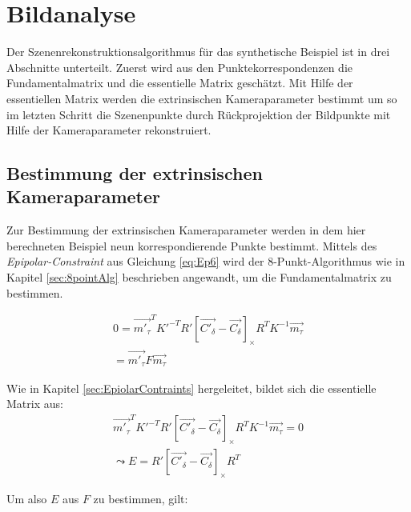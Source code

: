 


\section{Bildanalyse}
\label{sec:MinimalFun}

Der Szenenrekonstruktionsalgorithmus für das synthetische Beispiel ist in drei Abschnitte unterteilt. Zuerst wird aus den Punktekorrespondenzen die Fundamentalmatrix und die essentielle Matrix geschätzt. Mit Hilfe der essentiellen Matrix werden die extrinsischen Kameraparameter bestimmt um so im letzten Schritt die Szenenpunkte durch Rückprojektion der Bildpunkte mit Hilfe der Kameraparameter rekonstruiert. 

\subsection{Bestimmung der extrinsischen Kameraparameter}

Zur Bestimmung der extrinsischen Kameraparameter werden in dem hier berechneten Beispiel neun korrespondierende Punkte bestimmt. Mittels des \textit{Epipolar-Constraint} aus Gleichung \ref{eq:Ep6} wird der 8-Punkt-Algorithmus wie in Kapitel \ref{sec:8pointAlg} beschrieben angewandt, um die Fundamentalmatrix zu bestimmen.

\begin{gather}
	0=\vec{m'_\tau}^TK'^{-T}R' \left[ \vec{C'_\delta}-\vec{C_\delta}\right]_\times R^TK^{-1}\vec{m_\tau}\\
	=\vec{m'_\tau}F\vec{m_\tau}
\end{gather}


Wie in Kapitel \ref{sec:EpiolarContraints} hergeleitet, bildet sich die essentielle Matrix aus:
\begin{gather}
	\vec{m'_\tau}^TK'^{-T}R' \left[ \vec{C'_\delta}-\vec{C_\delta}\right]_\times R^TK^{-1}\vec{m_\tau}=0\\
	\leadsto E = R' \left[ \vec{C'_\delta}-\vec{C_\delta}\right]_\times R^T		
\end{gather}

Um also $E$ aus $F$ zu bestimmen, gilt:


